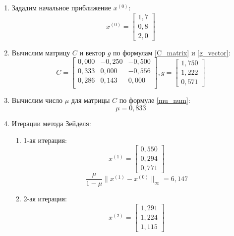 \documentclass[a4paper, 12pt]{article}
\theoremstyle{definition}
\begin{document}
	\begin{enumerate}
		\item Зададим начальное приближение $x^{(0)}$:
		\begin{equation*}
			x^{(0)}=
			\begin{bmatrix}
				1,7\\0,8\\2,0
			\end{bmatrix}
		\end{equation*}
		\item Вычислим матрицу $C$ и вектор $g$ по формулам \eqref{C_matrix} и \eqref{g_vector}:
		\begin{equation*}
			C=
			\begin{bmatrix}
				0,000  & -0,250 & -0,500\\
				0,333  & 0,000 &  -0,556\\
				0,286 &  0,143  & 0,000\\
			\end{bmatrix},
			g=
			\begin{bmatrix}
				1,750 \\  1,222 \\ 0,571
			\end{bmatrix}
		\end{equation*}
		\item Вычислим число $\mu$ для матрицы $C$ по формуле \eqref{mu_num}:
		\begin{equation}
			\mu=0,833
		\end{equation}
		\item Итерации метода Зейделя:
		\begin{enumerate}
			\item 1-ая итерация:
			\begin{equation*}
				x^{(1)}=
				\begin{bmatrix}
					0,550 \\  0,294  \\ 0,771
				\end{bmatrix}
			\end{equation*}
			\begin{equation*}
				\frac{\mu}{1-\mu}\|x^{(1)}-x^{(0)}\|_{\infty}=6,147
			\end{equation*}
			\item 2-ая итерация:
			\begin{equation*}
				x^{(2)}=
				\begin{bmatrix}
					1,291 \\  1,224  \\ 1,115
				\end{bmatrix}

\end{equation*}
\end{enumerate}
\end{enumerate}
\end{document}
